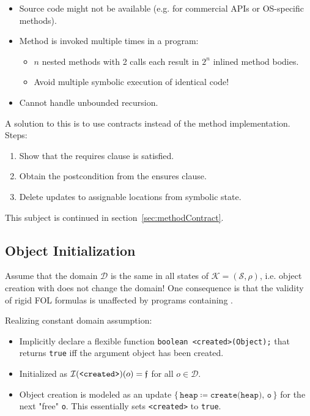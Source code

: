 				\begin{itemize}
					\item Source code might not be available (e.g. for commercial APIs or OS-specific methods).
					\item Method is invoked multiple times in a program:
						\begin{itemize}
							\item \(n\) nested methods with 2 calls each result in \(2^n\) inlined method bodies.
							\item Avoid multiple symbolic execution of identical code!
						\end{itemize}
					\item Cannot handle unbounded recursion.
				\end{itemize}
			
				A solution to this is to use contracts instead of the method implementation. Steps:
				\begin{enumerate}
					\item Show that the requires clause is satisfied.
					\item Obtain the postcondition from the ensures clause.
					\item Delete updates to assignable locations from symbolic state.
				\end{enumerate}
				This subject is continued in section~\ref{sec:methodContract}.
		
		\subsection{Object Initialization}
			Assume that the domain \(\mathcal{D}\) is the same in all states of \( \mathcal{K} = (\mathcal{S}, \rho) \), i.e. object creation with  does not change the domain! One consequence is that the validity of rigid FOL formulas is unaffected by programs containing .
			
			Realizing constant domain assumption:
			\begin{itemize}
				\item Implicitly declare a flexible function \texttt{boolean <created>(Object);} that returns \texttt{true} iff the argument object has been created.
				\item Initialized as \( \mathcal{I}(\texttt{<created>})(o) = \mathfrak{f} \) for all \( o \in \mathcal{D} \).
				\item Object creation is modeled as an update \( \{\, \texttt{heap} \coloneqq \texttt{create(heap), o} \,\} \) for the next "free" \texttt{o}. This essentially sets \texttt{<created>} to \texttt{true}.
			\end{itemize}
			
